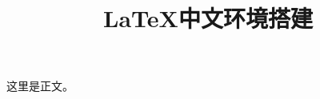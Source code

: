 \documentclass[a4paper]{ctexart}
\title{LaTeX中文环境搭建}
\begin{document}
	\maketitle
	这里是正文。
\end{document}

